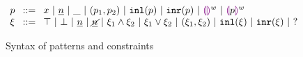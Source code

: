 
\begin{figure}[h]
$\arraycolsep=4pt\begin{array}{lll}
p & ::= &
  x ~\vert~
  \hnum{n} ~\vert~
  \_ ~\vert~
  \hpair{p_1}{p_2} ~\vert~
  \hinlp{p} ~\vert~
  \hinrp{p} ~\vert~
  \hehole{w} ~\vert~
  \hhole{p}{w} \\
\xi & ::= &
  \ctruth ~\vert~
  \cfalsity ~\vert~
  \cnum{n} ~\vert~
  \cnotnum{n} ~\vert~
  \cand{\xi_1}{\xi_2} ~\vert~
  \cor{\xi_1}{\xi_2} ~\vert~
  \cpair{\xi_1}{\xi_2} ~\vert~
  \cinl{\xi} ~\vert~
  \cinr{\xi} ~\vert~
  \cunknown
\end{array}$
\caption{Syntax of patterns and constraints}
\label{fig:pat-constraint}
\end{figure}
